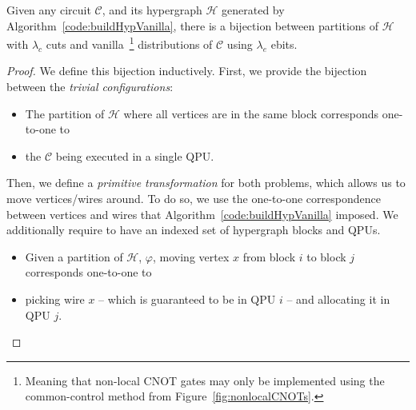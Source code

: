 \begin{theorem} Given any circuit \(\mathcal{C}\), and its hypergraph \(\mathcal{H}\) generated by Algorithm~\ref{code:buildHypVanilla}, there is a bijection between partitions of \(\mathcal{H}\) with \(\lambda_c\) cuts and vanilla~\footnote{Meaning that non-local CNOT gates may only be implemented using the common-control method from Figure~\ref{fig:nonlocalCNOTs}.} distributions of \(\mathcal{C}\) using \(\lambda_e\) ebits.
\label{thm:vanilla}
\end{theorem} \begin{proof}
We define this bijection inductively. First, we provide the bijection between the \textit{trivial configurations}:
\begin{itemize}
  \item The partition of \(\mathcal{H}\) where all vertices are in the same block corresponds one-to-one to 
  \item the \(\mathcal{C}\) being executed in a single QPU.
\end{itemize}

Then, we define a \textit{primitive transformation} for both problems, which allows us to move vertices/wires around. To do so, we use the one-to-one correspondence between vertices and wires that Algorithm~\ref{code:buildHypVanilla} imposed. We additionally require to have an indexed set of hypergraph blocks and QPUs.
\begin{itemize}
  \item Given a partition of \(\mathcal{H}\), \(\varphi\), moving vertex \(x\) from block \(i\) to block \(j\) corresponds one-to-one to
  \item picking wire \(x\) -- which is guaranteed to be in QPU \(i\) -- and allocating it in QPU \(j\).
\end{itemize}


\end{proof}
